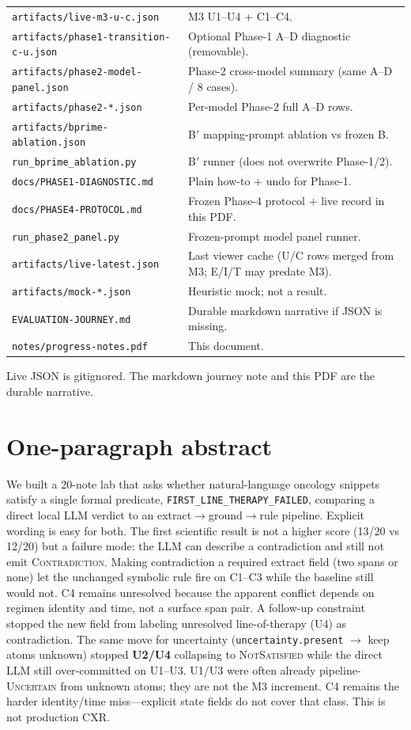 \documentclass[11pt,a4paper]{article}
\newcommand{\pred}{\texttt{FIRST\_LINE\_THERAPY\_FAILED}}
\newcommand{\nsat}{\textsc{NotSatisfied}}
\newcommand{\unc}{\textsc{Uncertain}}
\newcommand{\con}{\textsc{Contradiction}}
\begin{document}
\begin{tabularx}{\textwidth}{@{}l Y@{}}
\texttt{artifacts/live-m3-u-c.json} & M3 U1--U4 + C1--C4. \\
\texttt{artifacts/phase1-transition-c-u.json} & Optional Phase-1 A--D diagnostic (removable). \\
\texttt{artifacts/phase2-model-panel.json} & Phase-2 cross-model summary (same A--D / 8 cases). \\
\texttt{artifacts/phase2-*.json} & Per-model Phase-2 full A--D rows. \\
\texttt{artifacts/bprime-ablation.json} & B$'$ mapping-prompt ablation vs frozen B. \\
\texttt{run\_bprime\_ablation.py} & B$'$ runner (does not overwrite Phase-1/2). \\
\texttt{docs/PHASE1-DIAGNOSTIC.md} & Plain how-to + undo for Phase-1. \\
\texttt{docs/PHASE4-PROTOCOL.md} & Frozen Phase-4 protocol + live record in this PDF. \\
\texttt{run\_phase2\_panel.py} & Frozen-prompt model panel runner. \\
\texttt{artifacts/live-latest.json} & Last viewer cache (U/C rows merged from M3; E/I/T may predate M3). \\
\texttt{artifacts/mock-*.json} & Heuristic mock; not a result. \\
\texttt{EVALUATION-JOURNEY.md} & Durable markdown narrative if JSON is missing. \\
\texttt{notes/progress-notes.pdf} & This document. \\
\bottomrule
\end{tabularx}

Live JSON is gitignored. The markdown journey note and this PDF are the durable narrative.

\section{One-paragraph abstract}

We built a 20-note lab that asks whether natural-language oncology snippets satisfy a single formal predicate, \pred, comparing a direct local LLM verdict to an extract$\rightarrow$ground$\rightarrow$rule pipeline.
Explicit wording is easy for both.
The first scientific result is not a higher score (13/20 vs 12/20) but a failure mode: the LLM can describe a contradiction and still not emit \con.
Making contradiction a required extract field (two spans or none) let the unchanged symbolic rule fire on C1--C3 while the baseline still would not.
C4 remains unresolved because the apparent conflict depends on regimen identity and time, not a surface span pair.
A follow-up constraint stopped the new field from labeling unresolved line-of-therapy (U4) as contradiction.
The same move for uncertainty (\texttt{uncertainty.present} $\rightarrow$ keep atoms unknown) stopped \textbf{U2/U4} collapsing to \nsat{} while the direct LLM still over-committed on U1--U3.
U1/U3 were often already pipeline-\unc{} from unknown atoms; they are not the M3 increment.
C4 remains the harder identity/time miss---explicit state fields do not cover that class.
This is not production CXR.
\end{document}
